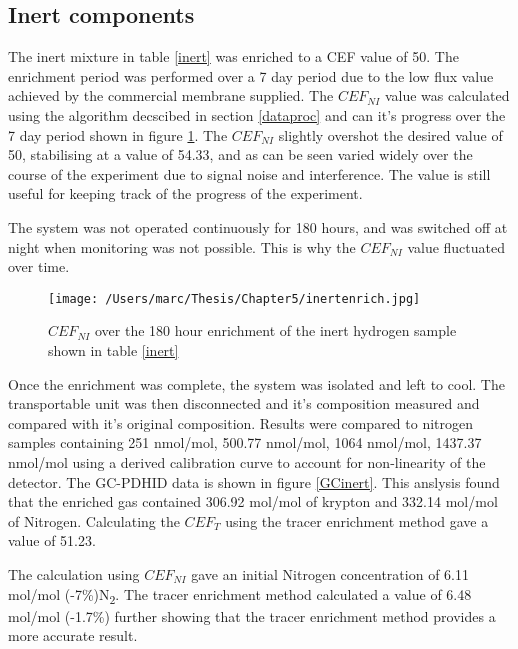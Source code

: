 \subsection{Inert components}\label{inertsec}
The inert mixture in table \ref{inert} was enriched to a CEF value of 50. The enrichment period was performed over a 7 day period due to the low flux value achieved by the commercial membrane supplied. The $CEF_{NI}$ value was calculated using the algorithm decscibed in section \ref{dataproc} and can it's progress over the 7 day period shown in figure \ref{GCNI}. The $CEF_{NI}$ slightly overshot the desired value of 50, stabilising at a value of 54.33, and as can be seen varied widely over the course of the experiment due to signal noise and interference. The value is still useful for keeping track of the progress of the experiment. 

The system was not operated continuously for 180 hours, and was switched off at night when monitoring was not possible. This is why the $CEF_{NI}$ value fluctuated over time. 

\begin{landscape}
    \begin{figure}
        \centering
        \texttt{[image: /Users/marc/Thesis/Chapter5/inertenrich.jpg]}
        \caption{$CEF_{NI}$ over the 180 hour enrichment of the inert hydrogen sample shown in table \ref{inert}}
        \label{GCNI}
    \end{figure}
\end{landscape}

Once the enrichment was complete, the system was isolated and left to cool. The transportable unit was then disconnected and it's composition measured and compared with it's original composition. Results were compared to nitrogen samples containing 251 nmol/mol, 500.77 nmol/mol, 1064 nmol/mol, 1437.37 nmol/mol using a derived calibration curve to account for non-linearity of the detector. The GC-PDHID data is shown in figure \ref{GCinert}. This anslysis found that the enriched gas contained 306.92 \textmu mol/mol of krypton and 332.14 \textmu mol/mol of Nitrogen. Calculating the $CEF_T$ using the tracer enrichment method gave a value of 51.23. 

The calculation using $CEF_{NI}$ gave an initial Nitrogen concentration of 6.11 \textmu mol/mol (-7\%)N\textsubscript{2}. The tracer enrichment method calculated a value of 6.48 \textmu mol/mol (-1.7\%) further showing that the tracer enrichment method provides a more accurate result. 

